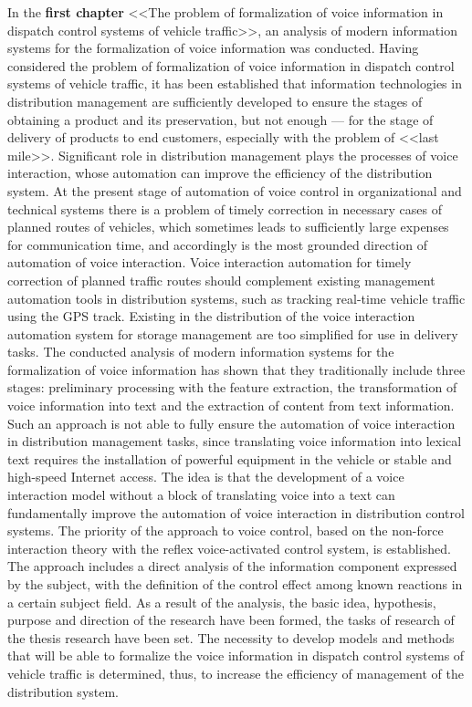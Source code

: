 In the \textbf{first chapter} <<The problem of formalization of voice information in dispatch control systems of vehicle traffic>>, an analysis of modern information systems for the formalization of voice information was conducted.
Having considered the problem of formalization of voice information in dispatch control systems of vehicle traffic, it has been established that information technologies in distribution management are sufficiently developed to ensure the stages of obtaining a product and its preservation, but not enough --- for the stage of delivery of products to end customers, especially with the problem of <<last mile>>. Significant role in distribution management plays the processes of voice interaction, whose automation can improve the efficiency of the distribution system.
At the present stage of automation of voice control in organizational and technical systems there is a problem of timely correction in necessary cases of planned routes of vehicles, which sometimes leads to sufficiently large expenses for communication time, and accordingly is the most grounded direction of automation of voice interaction.
Voice interaction automation for timely correction of planned traffic routes should complement existing management automation tools in distribution systems, such as tracking real-time vehicle traffic using the GPS track. Existing in the distribution of the voice interaction automation system for storage management are too simplified for use in delivery tasks.
The conducted analysis of modern information systems for the formalization of voice information has shown that they traditionally include three stages: preliminary processing with the feature extraction, the transformation of voice information into text and the extraction of content from text information. Such an approach is not able to fully ensure the automation of voice interaction in distribution management tasks, since translating voice information into lexical text requires the installation of powerful equipment in the vehicle or stable and high-speed Internet access. The idea is that the development of a voice interaction model without a block of translating voice into a text can fundamentally improve the automation of voice interaction in distribution control systems.
The priority of the approach to voice control, based on the non-force interaction theory with the reflex voice-activated control system, is established. The approach includes a direct analysis of the information component expressed by the subject, with the definition of the control effect among known reactions in a certain subject field.
As a result of the analysis, the basic idea, hypothesis, purpose and direction of the research have been formed, the tasks of research of the thesis research have been set. The necessity to develop models and methods that will be able to formalize the voice information in dispatch control systems of vehicle traffic is determined, thus, to increase the efficiency of management of the distribution system.

